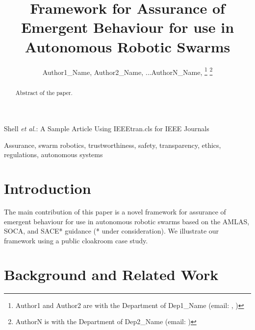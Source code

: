 \documentclass[lettersize,journal]{IEEEtran}
\begin{document}
\title{Framework for Assurance of Emergent Behaviour for use in Autonomous Robotic Swarms}

\author{Author1\_Name, Author2\_Name, ...AuthorN\_Name,
\thanks{Author1 and Author2 are with the Department of Dep1\_Name (email: , )}
\thanks{AuthorN is with the Department of Dep2\_Name (email: )}}
%
{Shell \MakeLowercase{\textit{et al.}}: A Sample Article Using IEEEtran.cls for IEEE Journals}


\maketitle

\begin{abstract}
	Abstract of the paper.
\end{abstract}

\begin{IEEEkeywords}
	Assurance, swarm robotics, trustworthiness, safety, transparency, ethics, regulations, autonomous systems
\end{IEEEkeywords}

\section{Introduction}\label{introduction}
The main contribution of this paper is a novel framework for assurance of emergent behaviour for use in autonomous robotic swarms based on the AMLAS, SOCA, and SACE* guidance (* under consideration). We illustrate our framework using a public cloakroom case study. 



\section{Background and Related Work}\label{background-relatedwork}
\end{document}
